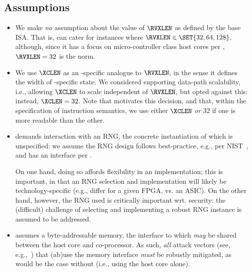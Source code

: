 
\subsection{Assumptions}
\label{sec:bg:assumption}

\begin{itemize}

\item We make {\em no} assumption about the value of $\RVXLEN$ as defined
      by the base ISA.  That is, \XCID can cater for instances where
      $
      \RVXLEN \in \SET{ 32, 64, 128 } ,
      $
      although, since it has a focus on micro-controller class host cores
      per ,
      $
      \RVXLEN = 32
      $
      is the norm.

\item We use $\XCLEN$ as an \XCID-specific analogue to $\RVXLEN$, in the
      sense it defines the width of \XCID-specific state.  We considered
      supporting data-path scalability, i.e., allowing $\XCLEN$ to scale
      independent of $\RVXLEN$, but opted against this: instead, 
      $
      \XCLEN = 32 .
      $
      Note that  motivates this decision, and that,
      within the specification of instruction semantics, we use either
      $\XCLEN$ {\em or} $32$ if one is more readable than the other.

\item \XCID demands interaction with an RNG, the concrete instantiation of 
      which is unspecified: we assume the RNG design follows best-practice,
      e.g., per NIST~\cite{SCARV:NIST:SP:800_90a,SCARV:NIST:SP:800_90b,SCARV:NIST:SP:800_90c},
      and has an interface per \cite[Section 6.4]{SCARV:NIST:SP:800_90c}.

      On one hand, doing so affords flexibility in an implementation; this 
      is important, in that an RNG selection and implementation will likely 
      be technology-specific (e.g., differ for a given FPGA, vs. an ASIC).  
      On the other hand, however, the RNG used is critically important wrt. 
      security: the (difficult) challenge of selecting and implementing 
      a robust RNG instance is assumed to be addressed.

\item \XCID assumes a byte-addressable memory, the interface to which {\em may}
      be shared between the host core and co-processor.  As such, {\em all}
      attack vectors
      (see, e.g.,~\cite{SCARV:GYCH:18})
      that (ab)use the memory interface {\em must} be robustly mitigated, 
      as would be the case without \XCID (i.e., using the host core alone).

\end{itemize}

